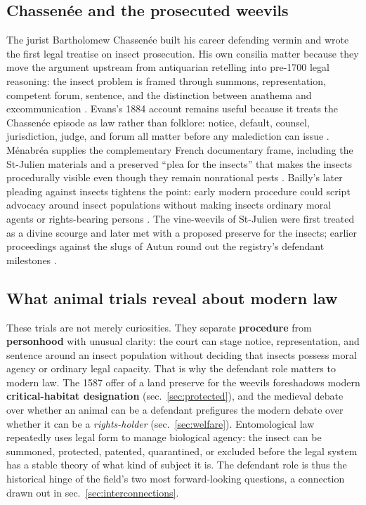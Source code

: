 \documentclass[
  english,
]{article}
\begin{document}
\subsection{Chassenée and the prosecuted
weevils}\label{chassenuxe9e-and-the-prosecuted-weevils}

The jurist Bartholomew Chassenée built his career defending vermin and
wrote the first legal treatise on insect prosecution. His own consilia
matter because they move the argument upstream from antiquarian
retelling into pre-1700 legal reasoning: the insect problem is framed
through summons, representation, competent forum, sentence, and the
distinction between anathema and excommunication
\citep{chasseneuz1581_consilia}. Evans's 1884 account remains useful
because it treats the Chassenée episode as law rather than folklore:
notice, default, counsel, jurisdiction, judge, and forum all matter
before any malediction can issue \citep{evans1884_bugs_beasts}. Ménabréa
supplies the complementary French documentary frame, including the
St-Julien materials and a preserved ``plea for the insects'' that makes
the insects procedurally visible even though they remain nonrational
pests \citep{menabrea1846_animal_judgments}. Bailly's later pleading
against insects tightens the point: early modern procedure could script
advocacy around insect populations without making insects ordinary moral
agents or rights-bearing persons \citep{bailly1668_monitoires_insectes}.
The vine-weevils of St-Julien were first treated as a divine scourge and
later met with a proposed preserve for the insects; earlier proceedings
against the slugs of Autun round out the registry's defendant milestones
\citep{evans1906}.

\subsection{What animal trials reveal about modern
law}\label{what-animal-trials-reveal-about-modern-law}

These trials are not merely curiosities. They separate
\textbf{procedure} from \textbf{personhood} with unusual clarity: the
court can stage notice, representation, and sentence around an insect
population without deciding that insects possess moral agency or
ordinary legal capacity. That is why the defendant role matters to
modern law. The 1587 offer of a land preserve for the weevils
foreshadows modern \textbf{critical-habitat designation}
(sec.~\ref{sec:protected}), and the medieval debate over whether an
animal can be a defendant prefigures the modern debate over whether it
can be a \emph{rights-holder} (sec.~\ref{sec:welfare}). Entomological
law repeatedly uses legal form to manage biological agency: the insect
can be summoned, protected, patented, quarantined, or excluded before
the legal system has a stable theory of what kind of subject it is. The
defendant role is thus the historical hinge of the field's two most
forward-looking questions, a connection drawn out in
sec.~\ref{sec:interconnections}.
\end{document}

